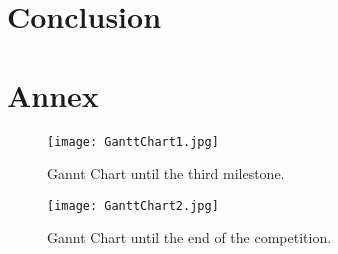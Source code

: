 \chapter{Conclusion}

\chapter{Annex}

\begin{figure}[H]
  \centering
  \texttt{[image: GanttChart1.jpg]}
  \caption{Gannt Chart until the third milestone.}
\label{fig:gannt1}
\end{figure}

\begin{figure}[H]
  \centering
  \texttt{[image: GanttChart2.jpg]}
  \caption{Gannt Chart until the end of the competition.}
\label{fig:gannt2}
\end{figure}